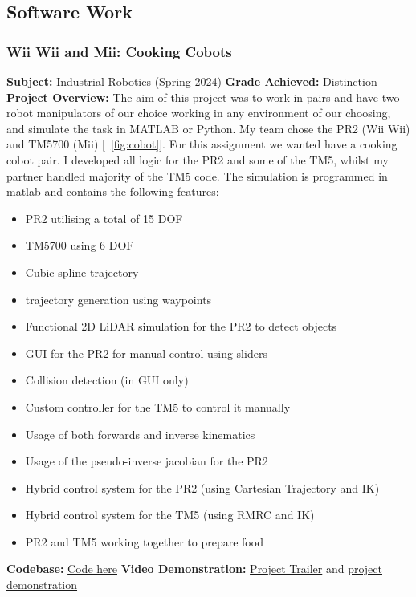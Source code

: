 \newpage
\subsection{Software Work}

\subsubsection{Wii Wii and Mii: Cooking Cobots}
\textbf{Subject: } Industrial Robotics (Spring 2024) \newline
\textbf{Grade Achieved: } Distinction \newline
\textbf{Project Overview: }
The aim of this project was to work in pairs and have two robot manipulators of our choice working in any environment of our choosing, and simulate the task in MATLAB or Python. My team chose the PR2 (Wii Wii) and TM5700 (Mii) [~\ref{fig:cobot}].
For this assignment we wanted have a cooking cobot pair. I developed all logic for the PR2 and some of the TM5, whilst my partner handled majority of the TM5 code. The simulation is programmed in matlab and 
contains the following features:

\begin{itemize}
    \item PR2 utilising a total of 15 DOF
    \item TM5700 using 6 DOF
    \item Cubic spline trajectory
    \item trajectory generation using waypoints
    \item Functional 2D LiDAR simulation for the PR2 to detect objects
    \item GUI for the PR2 for manual control using sliders
    \item Collision detection (in GUI only)
    \item Custom controller for the TM5 to control it manually
    \item Usage of both forwards and inverse kinematics 
    \item Usage of the pseudo-inverse jacobian for the PR2
    \item Hybrid control system for the PR2 (using Cartesian Trajectory and IK)
    \item Hybrid control system for the TM5 (using RMRC and IK)
    \item PR2 and TM5 working together to prepare food
\end{itemize}

\textbf{Codebase: } \href{https://github.com/jackfruittt/Industrial_Robotics_A2}{Code here} \newline
\textbf{Video Demonstration: } \href{https://www.youtube.com/watch?v=JsQmZcRGo9Y}{Project Trailer} and \href{https://youtu.be/irytygtPb94}{project demonstration} \newline


